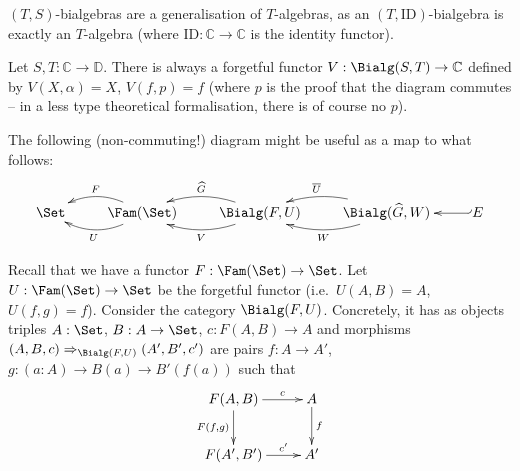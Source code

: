 \documentclass{article}
\begin{document}
\begin{note}
  $(T, S)$-bialgebras are a generalisation of $T$-algebras, as an $(T,
  \text{ID})$-bialgebra is exactly an $T$-algebra (where $\text{ID} :
  \mathbb{C} \to \mathbb{C}$ is the identity functor).
\end{note}

\begin{note}
  Let $S, T : \mathbb{C} \to \mathbb{D}$. There is always a forgetful
  functor $V : \Bialg(S, T) \to \mathbb{C}$ defined by $V(X, \alpha) =
  X$, $V(f, p) = f$ (where $p$ is the proof that the diagram commutes
  -- in a less type theoretical formalisation, there is of course no $p$).
\end{note}

The following (non-commuting!) diagram might be useful as a map to what follows:
\[
\xymatrix{
\Set & \ar@/_1pc/_-{F}[l] \ar@/^1pc/^-{U}[l]  \Fam(\Set)
 & \Bialg(F, U) \ar@/_1pc/_-{\widehat{G}}[l] \ar@/^1pc/^-{V}[l] & \Bialg(\widehat{G}, W) \ar@/_1pc/_-{\overline{U}}[l] \ar@/^1pc/^-{W}[l] & E \ar@{_{`}->}[l]
}
\]


Recall that we have a functor $F : \Fam(\Set) \to \Set$.
Let $U : \Fam(\Set) \to \Set$ be the forgetful functor (i.e.\ $U(A, B)
= A$, $U(f, g) = f$).  Consider the category $\Bialg(F,
U)$. Concretely, it has as objects triples $A : \Set$, $B : A \to
\Set$, $c : F(A, B) \to A$ and morphisms $(A, B, c)
\Rightarrow_{\Bialg(F, U)} (A', B', c')$ are pairs $f : A \to A'$, $g
: (a : A) \to B(a) \to B'(f(a))$ such that
\[
\xymatrix{
F(A, B) \ar^-{c}[r] \ar_-{F(f,g)}[d] & A \ar^-{f}[d] \\
F(A',B') \ar^-{c'}[r] & A' \\
}
\]
\end{document}
